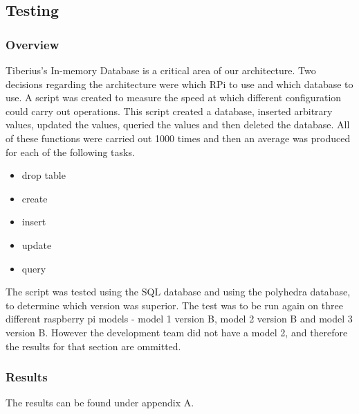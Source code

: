 \subsection{Testing}
\subsubsection{Overview}
Tiberius's In-memory Database is a critical area of our architecture. Two decisions regarding the architecture were which RPi to use and which database to use. A script was created to measure the speed at which different configuration could carry out operations. This script created a database, inserted arbitrary values, updated the values, queried the  values and then deleted the database. All of these functions were carried out 1000 times and then an average was produced for each of the following tasks.
\begin{itemize}
\item drop table
\item create
\item insert
\item update
\item query
\end{itemize}

The script was tested using the SQL database and using the polyhedra database, to determine which version was superior. The test was to be run again on three different raspberry pi models - model 1 version B, model 2 version B and model 3 version B. However the development team did not have a model 2, and therefore the results for that section are ommitted. 

\subsubsection{Results}
The results can be found under appendix A.

